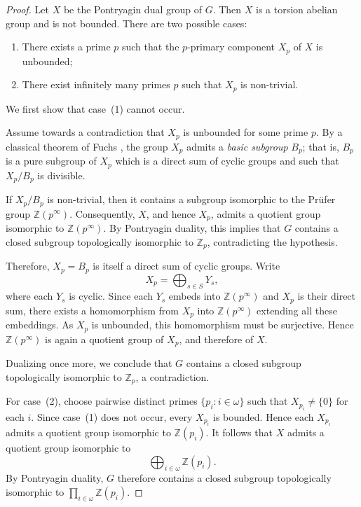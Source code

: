 \documentclass[12pt]{amsart}
\theoremstyle{definition}
\theoremstyle{remark}
\begin{document}
\begin{proof}
Let $X$ be the Pontryagin dual group of $G$.
Then $X$ is a torsion abelian group and is not bounded.
There are two possible cases:

\begin{enumerate}
\item[(1)] There exists a prime $p$ such that the $p$-primary component $X_p$ of $X$ is unbounded;
\item[(2)] There exist infinitely many primes $p$ such that $X_p$ is non-trivial.
\end{enumerate}

We first show that case~(1) cannot occur.

Assume towards a contradiction that $X_p$ is unbounded for some prime $p$.
By a classical theorem of Fuchs \cite[Theorem~32.3]{Fuc},
the group $X_p$ admits a \emph{basic subgroup} $B_p$; that is,
$B_p$ is a pure subgroup of $X_p$ which is a direct sum of cyclic groups
and such that $X_p/B_p$ is divisible.

If $X_p/B_p$ is non-trivial, then it contains a subgroup isomorphic to the Prüfer group
$\mathbb{Z}(p^\infty)$.
Consequently, $X$, and hence $X_p$, admits a quotient group isomorphic to $\mathbb{Z}(p^\infty)$.
By Pontryagin duality, this implies that $G$ contains a closed subgroup
topologically isomorphic to $\mathbb{Z}_p$, contradicting the hypothesis.

Therefore, $X_p=B_p$ is itself a direct sum of cyclic groups.
Write
\[
X_p=\bigoplus_{s\in S} Y_s,
\]
where each $Y_s$ is cyclic.
Since each $Y_s$ embeds into $\mathbb{Z}(p^\infty)$ and $X_p$ is their direct sum,
there exists a homomorphism from $X_p$ into $\mathbb{Z}(p^\infty)$ extending all these embeddings.
As $X_p$ is unbounded, this homomorphism must be surjective.
Hence $\mathbb{Z}(p^\infty)$ is again a quotient group of $X_p$, and therefore of $X$.

Dualizing once more, we conclude that $G$ contains a closed subgroup
topologically isomorphic to $\mathbb{Z}_p$, a contradiction.

For case~(2), choose pairwise distinct primes $\{p_i:i\in\omega\}$ such that
$X_{p_i}\neq\{0\}$ for each $i$.
Since case~(1) does not occur, every $X_{p_i}$ is bounded.
Hence each $X_{p_i}$ admits a quotient group isomorphic to $\mathbb{Z}(p_i)$.
It follows that $X$ admits a quotient group isomorphic to
\[
\bigoplus_{i\in\omega}\mathbb{Z}(p_i).
\]
By Pontryagin duality, $G$ therefore contains a closed subgroup
topologically isomorphic to
$\prod_{i\in\omega}\mathbb{Z}(p_i).$
\end{proof}
\end{document}
